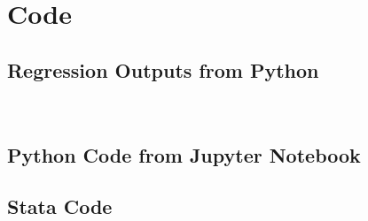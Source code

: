 \documentclass{article}
\begin{document}
\section{Code}

\subsection{Regression Outputs from Python}





​

\subsection{Python Code from Jupyter Notebook}





\subsection{Stata Code}


\end{document}
